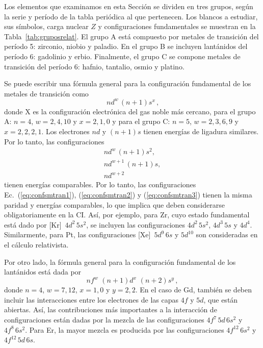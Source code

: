 Los elementos que examinamos en esta Sección se dividen en tres grupos, 
según la serie y período de la tabla periódica al que pertenecen. Los 
blancos a estudiar, sus símbolos, carga nuclear $Z$ y configuraciones 
fundamentales se muestran en la Tabla~\ref{tab:gruposrelat}. El grupo A
está compuesto por metales de transición del período 5: zirconio, niobio
y paladio. En el grupo B se incluyen lantánidos del período 6: 
gadolinio y erbio. Finalmente, el grupo C se compone metales de 
transición del período 6: hafnio, tantalio, osmio y platino.

Se puede escribir una fórmula general para la configuración fundamental 
de los metales de transición como
\begin{equation}
[\text{X}]\,nd^w\,(n+1)s^x\,,
\end{equation}
donde X es la configuración electrónica del gas noble más cercano, para 
el grupo A: $n=4$, $w=2,4,10$ y $x=2,1,0$ y para el grupo C: $n=5$, 
$w=2,3,6,9$ y $x=2,2,2,1$. Los electrones $nd$ y $(n+1)s$ tienen 
energías de ligadura similares. Por lo tanto, las configuraciones 
\begin{gather}
nd^w\,(n+1)s^2,
\label{eq:confsmtran1} \\
nd^{w+1}\,(n+1)s,
\label{eq:confsmtran2} \\
nd^{w+2}
\label{eq:confsmtran3}
\end{gather}
tienen energías comparables. Por lo tanto, las configuraciones 
Ec.~(\ref{eq:confsmtran1}), (\ref{eq:confsmtran2}) y 
(\ref{eq:confsmtran3}) tienen la misma paridad y energías comparables, 
lo que implica que deben considerarse obligatoriamente en la CI.
Así, por ejemplo, para Zr, cuyo estado fundamental está dado por 
[Kr]~$4d^2\,5s^2$, se incluyen las configuraciones $4d^2\,5s^2$, 
$4d^3\,5s$ y $4d^4$. Similarmente, para Pt, las configuraciones 
[Xe]~$5d^9\,6s$ y $5d^{10}$ son consideradas en el cálculo relativista.

Por otro lado, la fórmula general para la configuración fundamental de 
los lantánidos está dada por
\begin{equation}
nf^w\,\,(n+1)d^x\,\,(n+2)s^y\,,
\end{equation}
donde $n=4$, $w=7,12$, $x=1,0$ y $y=2,2$. En el caso de Gd, también 
se deben incluir las interacciones entre los electrones de las capas
$4f$ y $5d$, que están abiertas. Así, las contribuciones más 
importantes a la interacción de configuraciones están dadas por la 
mezcla de las configuraciones $4f^7\,5d\,6s^2$ y $4f^8\,6s^2$.
Para Er, la mayor mezcla es producida por las configuraciones 
$4f^{12}\,6s^2$ y $4f^{12}\,5d\,6s$.

